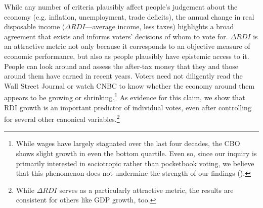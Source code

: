 \documentclass[11pt]{article}
\begin{document}
While any number of criteria plausibly affect people's judgement about the economy (e.g. inflation, unemployment, trade deficits), the annual change in real disposable income ($\Delta RDI$---average income, less taxes) highlights a broad agreement that exists and informs voters' decisions of whom to vote for. $\Delta RDI$ is an attractive metric not only because it corresponds to an objective measure of economic performance, but also as people plausibly have epistemic access to it. People can look around and assess the after-tax money that they and those around them have earned in recent years. Voters need not diligently read the Wall Street Journal or watch CNBC to know whether the economy around them appears to be growing or shrinking.\footnote{While wages have largely stagnated over the last four decades, the CBO shows slight growth in even the bottom quartile. Even so, since our inquiry is primarily interested in sociotropic rather than pocketbook voting, we believe that this phenomenon does not undermine the strength of our findings (\cite{congress2011trends}).} %
As evidence for this claim, we show that RDI growth is an important predictor of individual votes, even after controlling for several other canonical variables.\footnote{While $\Delta RDI$ serves as a particularly attractive metric, the results are consistent for others like GDP growth, too.}
\end{document}
